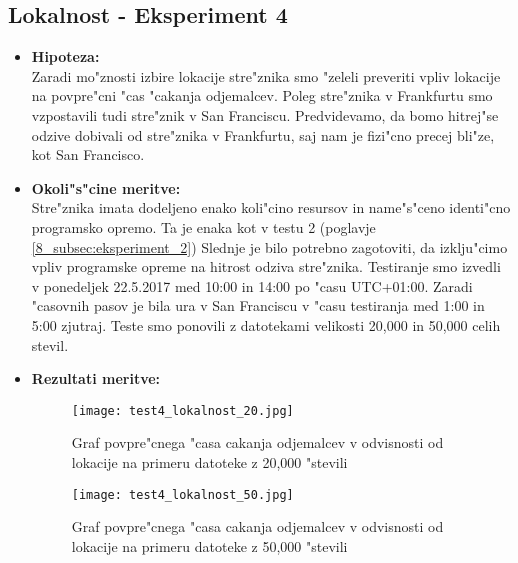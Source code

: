 \newpage
\subsection{Lokalnost - Eksperiment 4}
\label{8_subsec:eksperiment_4}
\begin{itemize}
	\item \textbf{Hipoteza: }  \\
		Zaradi mo"znosti izbire lokacije stre"znika smo "zeleli preveriti vpliv lokacije na povpre"cni "cas "cakanja odjemalcev. Poleg stre"znika v Frankfurtu smo vzpostavili tudi stre"znik v San Franciscu. Predvidevamo, da bomo hitrej"se odzive dobivali od stre"znika v Frankfurtu, saj nam je fizi"cno precej bli"ze, kot San Francisco.
	\item \textbf{Okoli"s"cine meritve: } \\
		Stre"znika imata dodeljeno enako koli"cino resursov in name"s"ceno identi"cno programsko opremo. Ta je enaka kot v testu 2 (poglavje \ref{8_subsec:eksperiment_2}) Slednje je bilo potrebno zagotoviti, da izklju"cimo vpliv programske opreme na hitrost odziva stre"znika. Testiranje smo izvedli v ponedeljek 22.5.2017 med 10:00 in 14:00 po "casu UTC+01:00. Zaradi "casovnih pasov je bila ura v San Franciscu v "casu testiranja med 1:00 in 5:00 zjutraj. Teste smo ponovili z datotekami velikosti 20,000 in 50,000 celih stevil.

 	\item \textbf{Rezultati meritve: }  \\
		\begin{figure}[h]
  		\centering
  		  \texttt{[image: test4\_lokalnost\_20.jpg]}
  		\caption{Graf povpre"cnega "casa cakanja odjemalcev v odvisnosti od lokacije na primeru datoteke z 20,000 "stevili}
  		\label{8_graf_lokalnost_20}
		\end{figure}

		\begin{figure}[h]
  		\centering
  		  \texttt{[image: test4\_lokalnost\_50.jpg]}
  		\caption{Graf povpre"cnega "casa cakanja odjemalcev v odvisnosti od lokacije na primeru datoteke z 50,000 "stevili}
  		\label{8_graf_lokalnost_50}
		\end{figure}


\end{itemize}

